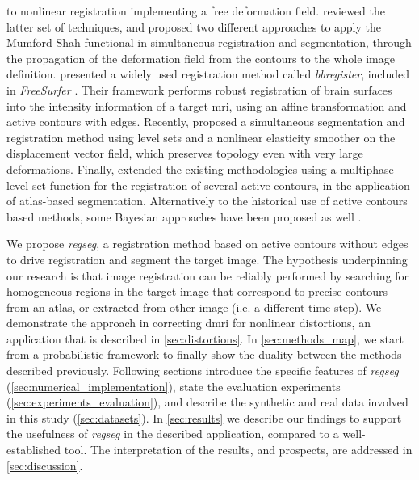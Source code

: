   to nonlinear registration implementing a free deformation field.
\cite{droske_mumfordshah_2009} reviewed the latter set of techniques, and proposed two different
  approaches to apply the Mumford-Shah functional \citep{mumford_optimal_1989} in simultaneous
  registration and segmentation, through the propagation of the deformation field from
  the contours to the whole image definition.
\cite{greve_accurate_2009} presented a widely used registration method called \emph{bbregister},
  included in \emph{FreeSurfer} \citep{fischl_freesurfer_2012}.
Their framework performs robust registration of brain surfaces into the intensity information
  of a target \gls*{mri}, using an affine transformation and active contours with edges.
Recently, \cite{guyader_combined_2011} proposed a simultaneous segmentation and
  registration method using level sets and a nonlinear elasticity smoother on the
  displacement vector field, which preserves topology even with very large deformations.
Finally, \cite{gorthi_active_2011} extended the existing methodologies using a multiphase
  level-set function for the registration of several active contours, in the application
  of atlas-based segmentation.
Alternatively to the historical use of active contours based methods, some Bayesian approaches
  have been proposed as well \citep{wyatt_map_2003,pohl_bayesian_2006,gass_simultaneous_2014}.

We propose \emph{regseg}, a registration method based on active contours without edges
  \citep{chan_active_2001} to drive registration and segment the target image.
The hypothesis underpinning our research is that image registration can be reliably performed
  by searching for homogeneous regions in the target image that correspond to precise contours
  from an atlas, or extracted from other image (i.e. a different time step).
We demonstrate the approach in correcting \gls*{dmri} for nonlinear distortions, an application
  that is described in \autoref{sec:distortions}.
In \autoref{sec:methods_map}, we start from a probabilistic framework to finally show the duality
  between the methods described previously.
Following sections introduce
  the specific features of \emph{regseg} (\autoref{sec:numerical_implementation}),
  state the evaluation experiments (\autoref{sec:experiments_evaluation}),
  and describe the synthetic and real data involved in this study (\autoref{sec:datasets}).
In \autoref{sec:results} we describe our findings to support the usefulness of \emph{regseg}
  in the described application, compared to a well-established tool.
The interpretation of the results, and prospects, are addressed in \autoref{sec:discussion}.


